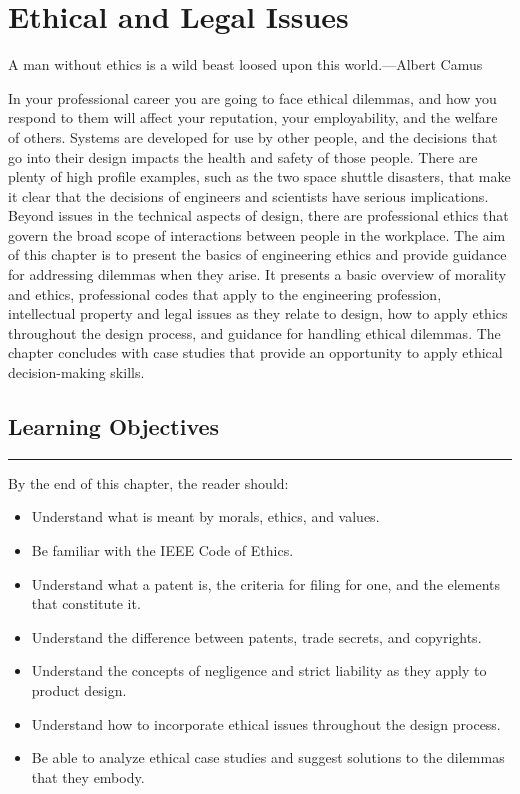 \chapter{ Ethical and Legal Issues}
\label{chapter:ethicsLegal}
\graphicspath{ {./chapter11/Fig} }

\begin{itquote}
A man without ethics is a wild beast loosed upon this world.---Albert
Camus
\end{itquote}

In your professional career you are going to face ethical dilemmas, and
how you respond to them will affect your reputation, your employability,
and the welfare of others. Systems are developed for use by other
people, and the decisions that go into their design impacts the health
and safety of those people. There are plenty of high profile examples,
such as the two space shuttle disasters, that make it clear that the
decisions of engineers and scientists have serious implications. Beyond
issues in the technical aspects of design, there are professional ethics
that govern the broad scope of interactions between people in the
workplace. The aim of this chapter is to present the basics of
engineering ethics and provide guidance for addressing dilemmas when
they arise. It presents a basic overview of morality and ethics,
professional codes that apply to the engineering profession,
intellectual property and legal issues as they relate to design, how to
apply ethics throughout the design process, and guidance for handling
ethical dilemmas. The chapter concludes with case studies that provide
an opportunity to apply ethical decision-making skills.

\section*{Learning Objectives}
\noindent\rule{\linewidth}{1pt}
By the end of this chapter, the reader should:

\begin{itemize}
\item
  Understand what is meant by morals, ethics, and values.
\item
  Be familiar with the IEEE Code of Ethics.
\item
  Understand what a patent is, the criteria for filing for one, and the
  elements that constitute it.
\item
  Understand the difference between patents, trade secrets, and
  copyrights.
\item
  Understand the concepts of negligence and strict liability as they
  apply to product design.
\item
  Understand how to incorporate ethical issues throughout the design
  process.
\item
  Be able to analyze ethical case studies and suggest solutions to the
  dilemmas that they embody.
\end{itemize}

